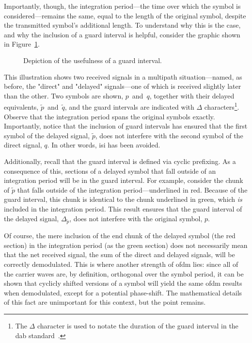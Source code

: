 \documentclass[class=report,11pt,crop=false]{standalone}
\begin{document}
Importantly, though, the integration period---the time over which the symbol is considered---remains the same, equal to the length of the original symbol, despite the transmitted symbol's additional length. To understand why this is the case, and why the inclusion of a guard interval is helpful, consider the graphic shown in Figure~\ref{fig:guard-intervals-demo-2}.

\begin{figure}[htbp]
    \centering
    \captionsetup{type=figure}
    \def\svgwidth{\linewidth}
    { %
        }
    \caption{Depiction of the usefulness of a guard interval.}
    \label{fig:guard-intervals-demo-2}
\end{figure}

This illustration shows two received signals in a multipath situation---named, as before, the "direct" and "delayed" signals---one of which is received slightly later than the other. Two symbols are shown, \(p\)~and~\(q\), together with their delayed equivalents, \(\tilde{p}\)~and~\(\tilde{q}\), and the guard intervals are indicated with \(\Delta\) characters\footnote{The \(\Delta\) character is used to notate the duration of the guard interval in the \gls{dab} standard~\cite{dabstandard}.}. Observe that the integration period spans the original symbols exactly. Importantly, notice that the inclusion of guard intervals has ensured that the first symbol of the delayed signal, \(\tilde{p}\), does not interfere with the second symbol of the direct signal, \(q\). In other words, \gls{isi} has been avoided.

Additionally, recall that the guard interval is defined via cyclic prefixing. As a consequence of this, sections of a delayed symbol that fall outside of an integration period will be in the guard interval. For example, consider the chunk of \(\tilde{p}\) that falls outside of the integration period---underlined in red. Because of the guard interval, this chunk is identical to the chunk underlined in green, which \emph{is} included in the integration period. This result ensures that the guard interval of the delayed signal, \(\Delta_{\tilde{p}}\), does not interfere with the original symbol, \(p\).

Of course, the mere inclusion of the end chunk of the delayed symbol (the red section) in the integration period (as the green section) does not necessarily mean that the net received signal, the sum of the direct and delayed signals, will be correctly demodulated. This is where another strength of \gls{ofdm} lies: since all of the carrier waves are, by definition, orthogonal over the symbol period, it can be shown that cyclicly shifted versions of a symbol will yield the same \gls{ofdm} results when demodulated, except for a potential phase-shift. The mathematical details of this fact are unimportant for this context, but the point remains.
\end{document}
